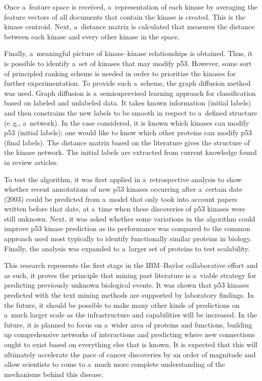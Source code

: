 \begin{multicols}{2}
  Once a~feature space is received, a~representation of each kinase by averaging the
feature vectors of all documents that contain the kinase is created. This is the kinase
centroid. Next, a~distance matrix is calculated that measures the distance between each
kinase and every other kinase in the space.

  Finally, a~meaningful picture of kinase--kinase relationships is obtained.  Thus, it is
possible to identify a~set of kinases that may modify p53. However, some sort of
principled ranking scheme is needed in order to prioritize the kinases for further
experimentation. To provide such a~scheme, the graph diffusion method~\cite{78-kl}
was used. Graph diffusion is a~semisupervised learning approach for classification
based on labeled and unlabeled data. It takes known information (initial labels) and
then constrains the new labels to be smooth in respect to a~defined structure (e.\,g.,
a~network). In the case considered, it is known which kinases can modify p53
(initial labels); one
would like to know which other proteins can modify p53 (final labels). The distance
matrix based on the literature gives the structure of the kinase network. The initial
labels are extracted from current knowledge found in review articles.

  To test the algorithm, it was first applied in a~retrospective analysis to show
whether recent annotations of new p53 kinases occurring after a~certain date (2003)
could be predicted from a~model that only took into account papers written before
that date, at a~time when these discoveries of p53 kinases were still unknown. Next,
it was asked whether some variations in the algorithm could improve p53 kinase
prediction as  its performance  was compared to the common approach used most
typically to identify functionally similar proteins in biology. Finally, the analysis was
expanded to a~larger set of proteins to test scalability.

  This research represents the first stage in the IBM--Baylor collaborative effort
and as such, it proves the principle that mining past literature is a~viable strategy for
predicting previously unknown biological events. It was shown that p53 kinases
predicted with the text mining methods are supported by laboratory findings. In the
future, it should be possible to make many other kinds of predictions on a~much
larger scale as the infrastructure and capabilities will be increased. In the future, it is
planned to focus on a~wider area of proteins and functions, building up
comprehensive networks of interactions and predicting where new connections ought
to exist based on everything else that is known. It is expected that  this will ultimately
accelerate the pace of cancer discoveries by an order of magnitude and allow
scientists to come to a~much more complete understanding of the mechanisms behind
this disease.


\end{multicols}
